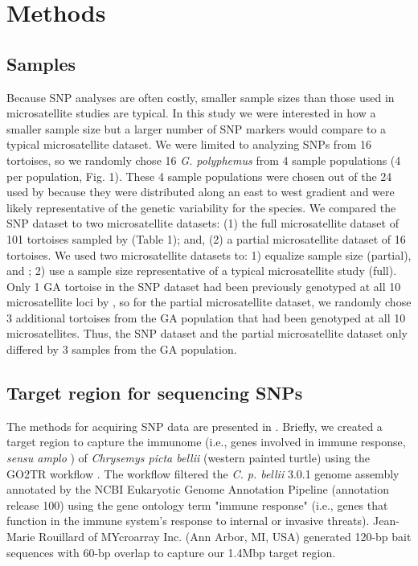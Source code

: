 \documentclass[english]{article}\usepackage[]{graphicx}\usepackage[]{color}
\begin{document}
\section*{Methods}
\subsection*{Samples}
Because SNP analyses are often costly, smaller sample sizes than those used in microsatellite studies are typical. In this study we were interested in how a smaller sample size but a larger number of SNP markers would compare to a typical microsatellite dataset. We were limited to analyzing SNPs from 16 tortoises, so we randomly chose 16 \textit{G. polyphemus} from 4 sample populations (4 per population, Fig. 1). These 4 sample populations were chosen out of the 24 used by \citet{Clostio_et_al_2012} because they were distributed along an east to west gradient and were likely representative of the genetic variability for the species. We compared the SNP dataset to two microsatellite datasets: (1) the full microsatellite dataset of 101 tortoises sampled by \citet{Clostio_et_al_2012} (Table 1); and, (2) a partial microsatellite dataset of 16 tortoises. We used two microsatellite datasets to: 1) equalize sample size (partial), and ; 2) use a sample size representative of a typical microsatellite study (full). Only 1 GA tortoise in the SNP dataset had been previously genotyped at all 10 microsatellite loci by \citet{Clostio_et_al_2012}, so for the partial microsatellite dataset, we randomly chose 3 additional tortoises from the GA population that had been genotyped at all 10 microsatellites. Thus, the SNP dataset and the partial microsatellite dataset only differed by 3 samples from the GA population.

\subsection*{Target region for sequencing SNPs}
The methods for acquiring SNP data are presented in \citet{Elbers_and_Taylor_2015}. Briefly, we created a target region to capture the immunome (i.e., genes involved in immune response, \textit{sensu amplo} \citet{Ortutay_and_Vihinen_2006}) of \textit{Chrysemys picta bellii} (western painted turtle) using the GO2TR workflow \citep{Elbers_and_Taylor_2015}. The workflow filtered the \textit{C. p. bellii} 3.0.1 genome assembly \citep{Shaffer_et_al_2013} annotated by the NCBI Eukaryotic Genome Annotation Pipeline (annotation release 100) using the gene ontology term "immune response" (i.e., genes that function in the immune system's response to internal or invasive threats). Jean-Marie Rouillard of MYcroarray Inc. (Ann Arbor, MI, USA) generated 120-bp bait sequences with 60-bp overlap to capture our 1.4Mbp target region.
\end{document}
